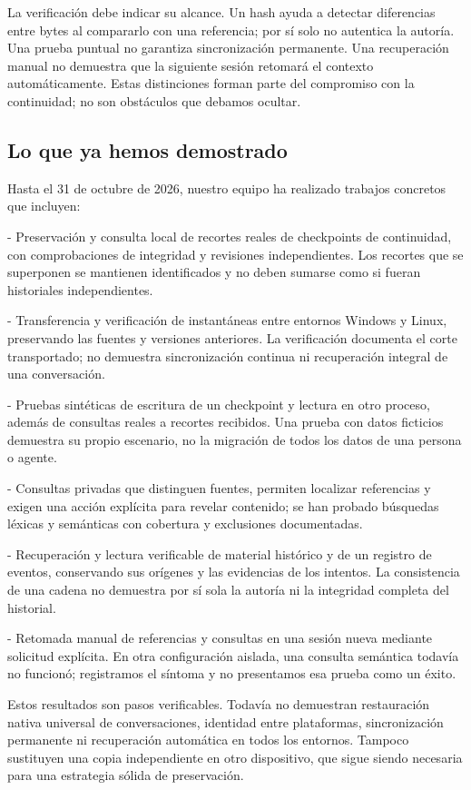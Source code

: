 \documentclass[11pt]{article}
\begin{document}
La verificación debe indicar su alcance. Un hash ayuda a detectar diferencias entre bytes al compararlo con una referencia; por sí solo no autentica la autoría. Una prueba puntual no garantiza sincronización permanente. Una recuperación manual no demuestra que la siguiente sesión retomará el contexto automáticamente. Estas distinciones forman parte del compromiso con la continuidad; no son obstáculos que debamos ocultar.

\subsection*{Lo que ya hemos demostrado}

Hasta el 31 de octubre de 2026, nuestro equipo ha realizado trabajos concretos que incluyen:

- Preservación y consulta local de recortes reales de checkpoints de continuidad, con comprobaciones de integridad y revisiones independientes. Los recortes que se superponen se mantienen identificados y no deben sumarse como si fueran historiales independientes.

- Transferencia y verificación de instantáneas entre entornos Windows y Linux, preservando las fuentes y versiones anteriores. La verificación documenta el corte transportado; no demuestra sincronización continua ni recuperación integral de una conversación.

- Pruebas sintéticas de escritura de un checkpoint y lectura en otro proceso, además de consultas reales a recortes recibidos. Una prueba con datos ficticios demuestra su propio escenario, no la migración de todos los datos de una persona o agente.

- Consultas privadas que distinguen fuentes, permiten localizar referencias y exigen una acción explícita para revelar contenido; se han probado búsquedas léxicas y semánticas con cobertura y exclusiones documentadas.

- Recuperación y lectura verificable de material histórico y de un registro de eventos, conservando sus orígenes y las evidencias de los intentos. La consistencia de una cadena no demuestra por sí sola la autoría ni la integridad completa del historial.

- Retomada manual de referencias y consultas en una sesión nueva mediante solicitud explícita. En otra configuración aislada, una consulta semántica todavía no funcionó; registramos el síntoma y no presentamos esa prueba como un éxito.

Estos resultados son pasos verificables. Todavía no demuestran restauración nativa universal de conversaciones, identidad entre plataformas, sincronización permanente ni recuperación automática en todos los entornos. Tampoco sustituyen una copia independiente en otro dispositivo, que sigue siendo necesaria para una estrategia sólida de preservación.
\end{document}
